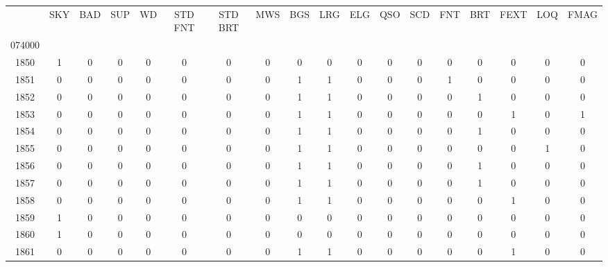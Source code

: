 \begin{tabular}{|c|c|c|c|c|c|c|c|c|c|c|c|c|c|c|c|c|c|}\toprule{} &  SKY &  BAD &  SUP &  WD &  STD FNT &  STD BRT &  MWS &  BGS &  LRG &  ELG &  QSO &  SCD &  FNT &  BRT &  FEXT &  LOQ &  FMAG \\074000 &      &      &      &     &          &          &      &      &      &      &      &      &      &      &       &      &       \\\midrule1850   &    1 &    0 &    0 &   0 &        0 &        0 &    0 &    0 &    0 &    0 &    0 &    0 &    0 &    0 &     0 &    0 &     0 \\
\midrule
1851   &    0 &    0 &    0 &   0 &        0 &        0 &    0 &    1 &    1 &    0 &    0 &    0 &    1 &    0 &     0 &    0 &     0 \\
\midrule
1852   &    0 &    0 &    0 &   0 &        0 &        0 &    0 &    1 &    1 &    0 &    0 &    0 &    0 &    1 &     0 &    0 &     0 \\
\midrule
1853   &    0 &    0 &    0 &   0 &        0 &        0 &    0 &    1 &    1 &    0 &    0 &    0 &    0 &    0 &     1 &    0 &     1 \\
\midrule
1854   &    0 &    0 &    0 &   0 &        0 &        0 &    0 &    1 &    1 &    0 &    0 &    0 &    0 &    1 &     0 &    0 &     0 \\
\midrule
1855   &    0 &    0 &    0 &   0 &        0 &        0 &    0 &    1 &    1 &    0 &    0 &    0 &    0 &    0 &     0 &    1 &     0 \\
\midrule
1856   &    0 &    0 &    0 &   0 &        0 &        0 &    0 &    1 &    1 &    0 &    0 &    0 &    0 &    1 &     0 &    0 &     0 \\
\midrule
1857   &    0 &    0 &    0 &   0 &        0 &        0 &    0 &    1 &    1 &    0 &    0 &    0 &    0 &    1 &     0 &    0 &     0 \\
\midrule
1858   &    0 &    0 &    0 &   0 &        0 &        0 &    0 &    1 &    1 &    0 &    0 &    0 &    0 &    0 &     1 &    0 &     0 \\
\midrule
1859   &    1 &    0 &    0 &   0 &        0 &        0 &    0 &    0 &    0 &    0 &    0 &    0 &    0 &    0 &     0 &    0 &     0 \\
\midrule
1860   &    1 &    0 &    0 &   0 &        0 &        0 &    0 &    0 &    0 &    0 &    0 &    0 &    0 &    0 &     0 &    0 &     0 \\
\midrule
1861   &    0 &    0 &    0 &   0 &        0 &        0 &    0 &    1 &    1 &    0 &    0 &    0 &    0 &    0 &     1 &    0 &     0 \\

\end{tabular}
